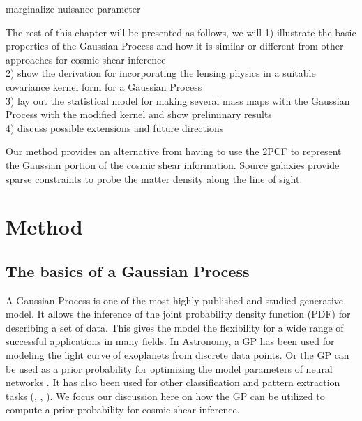marginalize nuisance parameter 


The rest of this chapter will be presented as follows, we will  
1) illustrate the basic properties of the Gaussian Process and how it is
similar or different from other approaches for cosmic shear inference  \\ 
2) show the derivation for incorporating the lensing physics in 
a suitable covariance kernel form for a Gaussian Process  \\
3) lay out the statistical model for making several mass maps 
with the Gaussian Process with the modified kernel and show preliminary results \\ 
4) discuss possible extensions and future directions 
 
Our method provides an alternative from having to use the 2PCF to represent the
Gaussian portion of the cosmic shear information. 
Source galaxies provide sparse constraints to probe the matter density along
the line of sight. 

\section{Method}

\subsection{The basics of a Gaussian Process}
A Gaussian Process is one of the most highly published and studied 
generative model. It allows the inference of the joint probability density 
function (PDF) for describing a set of data. 
This gives the model the flexibility for a wide range
of successful applications in many fields. 
In Astronomy, a GP has been used for modeling 
the light curve of exoplanets from discrete data points\citep{Ambikasaran2014a}.
Or the GP can be used as a prior probability for optimizing the model parameters of
neural networks \citep{Snoek2012}. 
It has also been used for other classification and pattern extraction tasks 
(\citealt{Wilson2013}, \citealt{Duvenaud2013}, \citealt{Rasmussen2006}).
We focus our discussion here on how the GP can be utilized to compute a prior
probability for cosmic shear inference.
 

